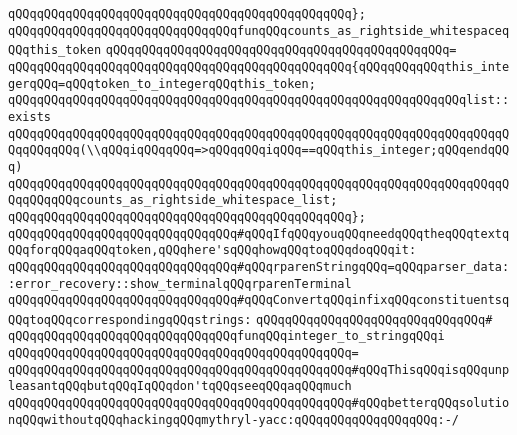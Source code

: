 \verb|qQQqqQQqqQQqqQQqqQQqqQQqqQQqqQQqqQQqqQQqqQQqqQQq};|\newline
\newline
\verb|qQQqqQQqqQQqqQQqqQQqqQQqqQQqqQQqfunqQQqcounts_as_rightside_whitespaceqQQqthis_token|\newline
\verb|qQQqqQQqqQQqqQQqqQQqqQQqqQQqqQQqqQQqqQQqqQQqqQQq=|\newline
\verb|qQQqqQQqqQQqqQQqqQQqqQQqqQQqqQQqqQQqqQQqqQQqqQQq{qQQqqQQqqQQqthis_integerqQQq=qQQqtoken_to_integerqQQqthis_token;|\newline
\newline
\verb|qQQqqQQqqQQqqQQqqQQqqQQqqQQqqQQqqQQqqQQqqQQqqQQqqQQqqQQqqQQqqQQqlist::exists|\newline
\verb|qQQqqQQqqQQqqQQqqQQqqQQqqQQqqQQqqQQqqQQqqQQqqQQqqQQqqQQqqQQqqQQqqQQqqQQqqQQqqQQq(\\qQQqiqQQqqQQq=>qQQqqQQqiqQQq==qQQqthis_integer;qQQqendqQQq)|\newline
\verb|qQQqqQQqqQQqqQQqqQQqqQQqqQQqqQQqqQQqqQQqqQQqqQQqqQQqqQQqqQQqqQQqqQQqqQQqqQQqqQQqcounts_as_rightside_whitespace_list;|\newline
\verb|qQQqqQQqqQQqqQQqqQQqqQQqqQQqqQQqqQQqqQQqqQQqqQQq};|\newline
\newline
\verb|qQQqqQQqqQQqqQQqqQQqqQQqqQQqqQQq#qQQqIfqQQqyouqQQqneedqQQqtheqQQqtextqQQqforqQQqaqQQqtoken,qQQqhere'sqQQqhowqQQqtoqQQqdoqQQqit:|\newline
\verb|qQQqqQQqqQQqqQQqqQQqqQQqqQQqqQQq#qQQqrparenStringqQQq=qQQqparser_data::error_recovery::show_terminalqQQqrparenTerminal|\newline
\newline
\newline
\verb|qQQqqQQqqQQqqQQqqQQqqQQqqQQqqQQq#qQQqConvertqQQqinfixqQQqconstituentsqQQqtoqQQqcorrespondingqQQqstrings:|\newline
\verb|qQQqqQQqqQQqqQQqqQQqqQQqqQQqqQQq#|\newline
\verb|qQQqqQQqqQQqqQQqqQQqqQQqqQQqqQQqfunqQQqinteger_to_stringqQQqi|\newline
\verb|qQQqqQQqqQQqqQQqqQQqqQQqqQQqqQQqqQQqqQQqqQQqqQQq=|\newline
\verb|qQQqqQQqqQQqqQQqqQQqqQQqqQQqqQQqqQQqqQQqqQQqqQQq#qQQqThisqQQqisqQQqunpleasantqQQqbutqQQqIqQQqdon'tqQQqseeqQQqaqQQqmuch|\newline
\verb|qQQqqQQqqQQqqQQqqQQqqQQqqQQqqQQqqQQqqQQqqQQqqQQq#qQQqbetterqQQqsolutionqQQqwithoutqQQqhackingqQQqmythryl-yacc:qQQqqQQqqQQqqQQqqQQq:-/|\newline
